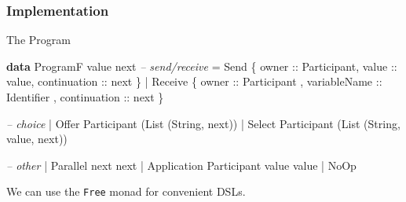 \documentclass[12pt]{beamer}
\newenvironment{Shaded}{}{}
\newcommand{\KeywordTok}[1]{\textcolor[rgb]{0.00,0.44,0.13}{\textbf{#1}}}
\newcommand{\DataTypeTok}[1]{\textcolor[rgb]{0.56,0.13,0.00}{#1}}
\newcommand{\CommentTok}[1]{\textcolor[rgb]{0.38,0.63,0.69}{\textit{#1}}}
\newcommand{\OtherTok}[1]{\textcolor[rgb]{0.00,0.44,0.13}{#1}}
\newcommand{\FunctionTok}[1]{\textcolor[rgb]{0.02,0.16,0.49}{#1}}
\newcommand{\NormalTok}[1]{#1}
\begin{document}
\begin{frame}[fragile]
\frametitle{Implementation}
    The Program 

\begin{Shaded}
\begin{Highlighting}[]
\KeywordTok{data} \DataTypeTok{ProgramF}\NormalTok{ value next }
    \CommentTok{-- send/receive}
    \FunctionTok{=} \DataTypeTok{Send} 
\NormalTok{        \{}\OtherTok{ owner ::} \DataTypeTok{Participant}\NormalTok{,}\OtherTok{ value ::}\NormalTok{ value,}\OtherTok{ continuation ::}\NormalTok{ next \}}
    \FunctionTok{|} \DataTypeTok{Receive} 
\NormalTok{        \{}\OtherTok{ owner ::} \DataTypeTok{Participant}
\NormalTok{        ,}\OtherTok{ variableName ::} \DataTypeTok{Identifier}
\NormalTok{        ,}\OtherTok{ continuation ::}\NormalTok{ next  }
\NormalTok{        \}}

    \CommentTok{-- choice}
    \FunctionTok{|} \DataTypeTok{Offer} \DataTypeTok{Participant}\NormalTok{ (}\DataTypeTok{List}\NormalTok{ (}\DataTypeTok{String}\NormalTok{, next))}
    \FunctionTok{|} \DataTypeTok{Select} \DataTypeTok{Participant}\NormalTok{ (}\DataTypeTok{List}\NormalTok{ (}\DataTypeTok{String}\NormalTok{, value, next))}

    \CommentTok{-- other}
    \FunctionTok{|} \DataTypeTok{Parallel}\NormalTok{ next next }
    \FunctionTok{|} \DataTypeTok{Application} \DataTypeTok{Participant}\NormalTok{ value value}
    \FunctionTok{|} \DataTypeTok{NoOp}
\end{Highlighting}
\end{Shaded}
    We can use the \texttt{Free} monad for convenient DSLs.

\end{frame}
\end{document}
